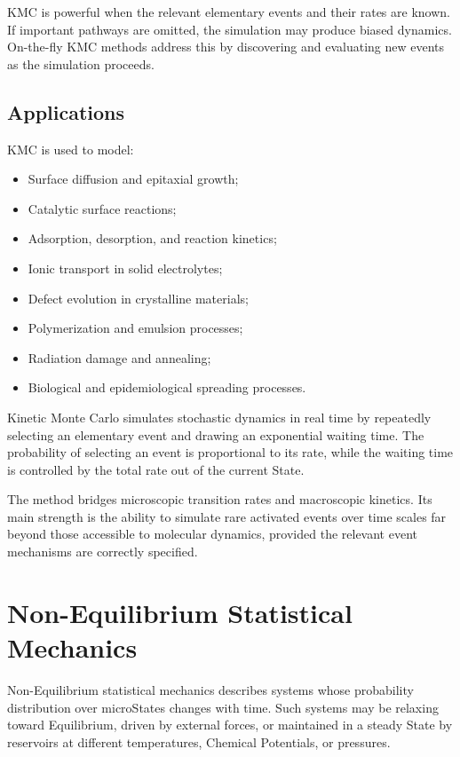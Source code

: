 \documentclass[a4paper, 10pt, onepage]{elegantbook}
\begin{document}
{KMC is powerful when the relevant elementary events and their rates are known.
If important pathways are omitted, the simulation may produce biased dynamics.
On-the-fly KMC methods address this by discovering and evaluating new events as
the simulation proceeds.

\subsection{Applications}

KMC is used to model:

\begin{itemize}
\item Surface diffusion and epitaxial growth;
\item Catalytic surface reactions;
\item Adsorption, desorption, and reaction kinetics;
\item Ionic transport in solid electrolytes;
\item Defect evolution in crystalline materials;
\item Polymerization and emulsion processes;
\item Radiation damage and annealing;
\item Biological and epidemiological spreading processes.
\end{itemize}

Kinetic Monte Carlo simulates stochastic dynamics in real time by repeatedly
selecting an elementary event and drawing an exponential waiting time. The
probability of selecting an event is proportional to its rate, while the waiting
time is controlled by the total rate out of the current State.

The method bridges microscopic transition rates and macroscopic kinetics. Its
main strength is the ability to simulate rare activated events over time scales
far beyond those accessible to molecular dynamics, provided the relevant event
mechanisms are correctly specified.



\section{Non-Equilibrium Statistical Mechanics}

Non-Equilibrium statistical mechanics describes systems whose probability
distribution over microStates changes with time. Such systems may be relaxing
toward Equilibrium, driven by external forces, or maintained in a steady State
by reservoirs at different temperatures, Chemical Potentials, or pressures.

}
\end{document}
